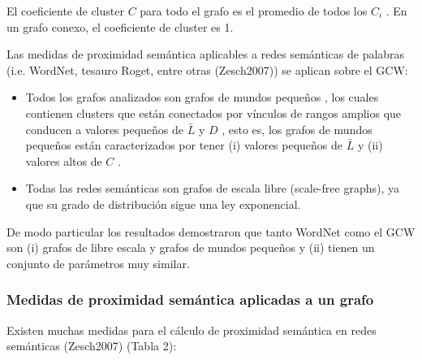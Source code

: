 \documentclass[letterpaper]{article}
\newcommand\textstylebibuscitbase[1]{#1}
\newcommand\liststyleLix{%
\renewcommand\labelitemi{{\textbullet}}
\renewcommand\labelitemii{${\circ}$}
\renewcommand\labelitemiii{${\blacksquare}$}
\renewcommand\labelitemiv{{\textbullet}}
}
\begin{document}
{\sffamily
\textstylebibuscitbase{El coeficiente de cluster } $C$
\textstylebibuscitbase{para todo el grafo es el promedio de todos los }
$C_{i}$ \textstylebibuscitbase{. En un grafo conexo, el coeficiente de
cluster es 1.}}


\bigskip

{\sffamily
\textstylebibuscitbase{Las medidas de proximidad sem\'antica aplicables
a redes sem\'anticas de palabras (i.e. WordNet, tesauro Roget, entre
otras }\textstylebibuscitbase{(Zesch2007)}\textstylebibuscitbase{) se
aplican sobre el GCW:}}


\bigskip

\liststyleLix
\begin{itemize}
\item {\sffamily
\textstylebibuscitbase{Todos los grafos analizados son grafos de mundos
peque\~nos}%
\textstylebibuscitbase{, los cuales contienen clusters que est\'an
conectados por v\'inculos de rangos amplios que conducen a valores
peque\~nos de } $\bar{L}$ \textstylebibuscitbase{y } $D$
\textstylebibuscitbase{, esto es, los grafos de mundos peque\~nos
est\'an caracterizados por tener (i) valores peque\~nos de } $\bar{L}$
\textstylebibuscitbase{y (ii) valores altos de } $C$
\textstylebibuscitbase{.}}
\item {\sffamily
\textstylebibuscitbase{Todas las redes sem\'anticas son grafos de escala
libre (scale-free graphs), ya que su grado de distribuci\'on sigue una
ley exponencial.}}
\end{itemize}

\bigskip

{\sffamily
\textstylebibuscitbase{De modo particular los resultados demostraron que
tanto WordNet como el }\textstylebibuscitbase{GCW son (i) grafos de
libre escala y grafos de mundos peque\~nos y (ii) tienen un conjunto de
par\'ametros muy similar.}}


\bigskip

\subsubsection[Medidas de proximidad sem\'antica aplicadas a un
grafo]{Medidas de proximidad sem\'antica aplicadas a un grafo}
\hypertarget{RefHeading10778782078703}{}
\bigskip

{\sffamily
Existen muchas medidas para el c\'alculo de proximidad sem\'antica en
redes sem\'anticas
\textstylebibuscitbase{(Zesch2007)}\textstylebibuscitbase{ (Tabla 2)}:}
\end{document}

